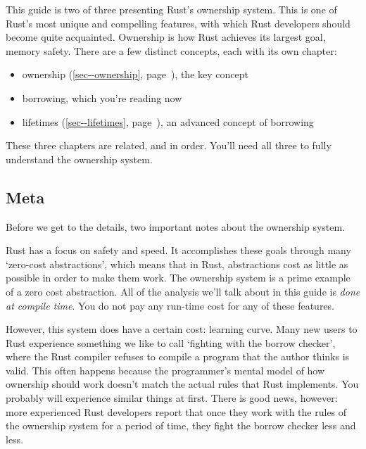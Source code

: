 \documentclass[a4paper,]{book}
\renewcommand*{\hyperref}[2][\ar]{%
  \def\ar{#2}%
  #2 (\autoref{#1}, page~\pageref{#1})}
\begin{document}

This guide is two of three presenting Rust's ownership system. This is
one of Rust's most unique and compelling features, with which Rust
developers should become quite acquainted. Ownership is how Rust
achieves its largest goal, memory safety. There are a few distinct
concepts, each with its own chapter:

\begin{itemize}
\itemsep1pt\parskip0pt
\item
  \hyperref[sec--ownership]{ownership}, the key concept
\item
  borrowing, which you're reading now
\item
  \hyperref[sec--lifetimes]{lifetimes}, an advanced concept of borrowing
\end{itemize}

These three chapters are related, and in order. You'll need all three to
fully understand the ownership system.

\subsection{Meta}\label{meta-1}

Before we get to the details, two important notes about the ownership
system.

Rust has a focus on safety and speed. It accomplishes these goals
through many `zero-cost abstractions', which means that in Rust,
abstractions cost as little as possible in order to make them work. The
ownership system is a prime example of a zero cost abstraction. All of
the analysis we'll talk about in this guide is \emph{done at compile
time}. You do not pay any run-time cost for any of these features.

However, this system does have a certain cost: learning curve. Many new
users to Rust experience something we like to call `fighting with the
borrow checker', where the Rust compiler refuses to compile a program
that the author thinks is valid. This often happens because the
programmer's mental model of how ownership should work doesn't match the
actual rules that Rust implements. You probably will experience similar
things at first. There is good news, however: more experienced Rust
developers report that once they work with the rules of the ownership
system for a period of time, they fight the borrow checker less and
less.
\end{document}
